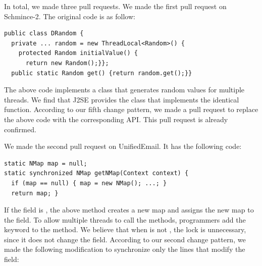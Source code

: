 In total, we made three pull requests. We made the first pull request on Schmince-2. The original code is as follow:

\begin{lstlisting}
public class DRandom {
  private ... random = new ThreadLocal<Random>() {
    protected Random initialValue() {
      return new Random();}};
  public static Random get() {return random.get();}}
\end{lstlisting}

The above code implements a class that generates random values for multiple threads. We find that J2SE provides the  class that implements the identical function. According to our fifth change pattern, we made a pull request to replace the above code with the corresponding API. This pull request is already confirmed.


We made the second pull request on UnifiedEmail. It has the following code:

\begin{lstlisting}
static NMap map = null;
static synchronized NMap getNMap(Context context) {
  if (map == null) { map = new NMap(); ...; }
  return map; }
\end{lstlisting}

If the  field is , the above method creates a new map and assigns the new map to the field. To allow multiple threads to call the methods, programmers add the  keyword to the method. We believe that when  is not , the lock is unnecessary, since it does not change the field. According to our second change pattern, we made the following modification to synchronize only the lines that modify the field:

